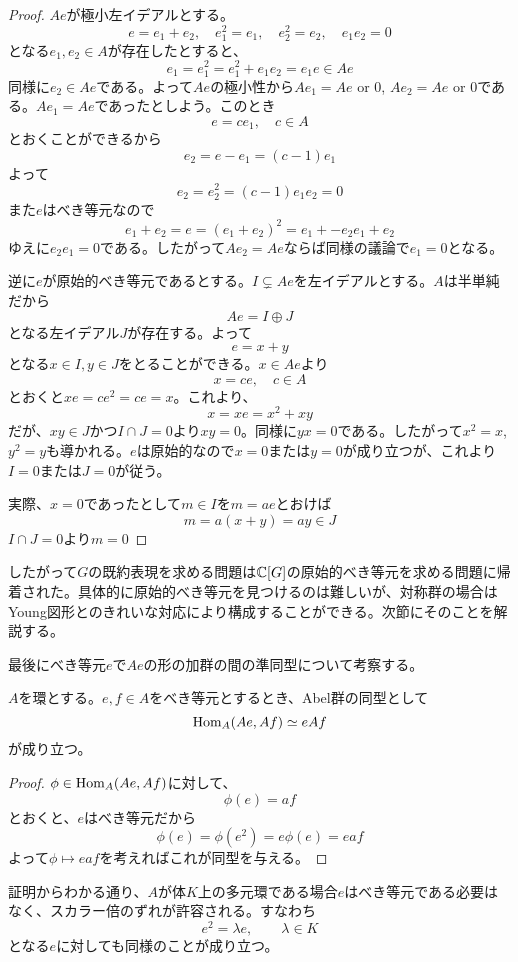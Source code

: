 \documentclass{ltjsreport}
\begin{document}
\begin{proof}
  $Ae$が極小左イデアルとする。
  \[
    e=e_1+e_2,\quad e_1^2=e_1,\quad e_2^2=e_2,\quad e_1e_2=0
  \]
  となる$e_1,e_2\in A$が存在したとすると、
  \[
  e_1=e_1^2=e_1^2+e_1e_2=e_1e\in Ae  
  \]
  同様に$e_2\in Ae$である。よって$Ae$の極小性から$Ae_1=Ae\text{ or }0$, $Ae_2=Ae\text{ or }0$である。$Ae_1=Ae$であったとしよう。このとき
  \[
  e=ce_1,\quad c\in A  
  \]
  とおくことができるから
  \[
  e_2=e-e_1=(c-1)e_1
  \]
  よって
  \[
  e_2=e_2^2=(c-1)e_1e_2=0
  \]
  また$e$はべき等元なので
  \[
  e_1+e_2=e=(e_1+e_2)^2=e_1+-e_2e_1+e_2
  \]
  ゆえに$e_2e_1=0$である。したがって$Ae_2=Ae$ならば同様の議論で$e_1=0$となる。

  逆に$e$が原始的べき等元であるとする。$I\subsetneq Ae$を左イデアルとする。$A$は半単純だから
  \[
  Ae=I\oplus J  
  \]
  となる左イデアル$J$が存在する。よって
  \[
  e=x+y
  \]
  となる$x\in I, y\in J$をとることができる。$x\in Ae$より
  \[
  x=ce,\quad c\in A  
  \]
  とおくと$xe=ce^2=ce=x$。これより、
  \[
  x=xe=x^2+xy  
  \]
  だが、$xy\in J$かつ$I\cap J=0$より$xy=0$。同様に$yx=0$である。したがって$x^2=x$, $y^2=y$も導かれる。$e$は原始的なので$x=0$または$y=0$が成り立つが、これより$I=0$または$J=0$が従う。

  実際、$x=0$であったとして$m\in I$を$m=ae$とおけば
  \[
  m=a(x+y)=ay\in J  
  \]
  $I\cap J=0$より$m=0$
\end{proof}

したがって$G$の既約表現を求める問題は$\mathbb{C}[G]$の原始的べき等元を求める問題に帰着された。具体的に原始的べき等元を見つけるのは難しいが、対称群の場合はYoung図形とのきれいな対応により構成することができる。次節にそのことを解説する。

最後にべき等元$e$で$Ae$の形の加群の間の準同型について考察する。

\begin{prop}\label{hom_of_cyclic_module}
  $A$を環とする。$e,f\in A$をべき等元とするとき、Abel群の同型として
  \[
  \text{Hom}_A(Ae,Af)\simeq eAf
  \]
  が成り立つ。
\end{prop}

\begin{proof}
  $\phi\in\text{Hom}_A(Ae,Af)$に対して、
  \[
  \phi(e)=af  
  \]
  とおくと、$e$はべき等元だから
  \[
  \phi(e)=\phi(e^2)=e\phi(e)=eaf  
  \]
  よって$\phi\mapsto eaf$を考えればこれが同型を与える。
\end{proof}

\begin{notice}
  証明からわかる通り、$A$が体$K$上の多元環である場合$e$はべき等元である必要はなく、スカラー倍のずれが許容される。すなわち
  \[
  e^2=\lambda e,\qquad \lambda\in K
  \]
  となる$e$に対しても同様のことが成り立つ。
\end{notice}
\end{document}
